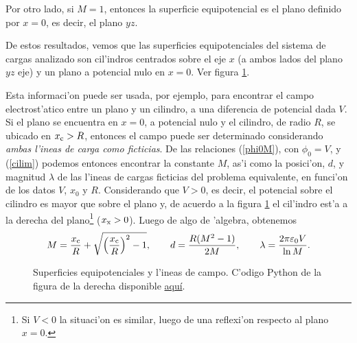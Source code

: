 Por otro lado, si $M=1$, entonces la superficie equipotencial es el plano
definido por $x=0$, es decir, el plano $yz$.

De estos resultados, vemos que las superficies equipotenciales del sistema de
cargas analizado son cil'indros centrados sobre el eje $x$ (a ambos lados del
plano $yz$ eje) y un plano a potencial nulo en $x=0$. Ver figura \ref{ci04}.
%

Esta informaci'on puede ser usada, por ejemplo, para encontrar el campo
electrost'atico entre un plano y un cilindro, a una diferencia de potencial
dada $V$. Si el plano se encuentra en $x=0$, a potencial nulo y el cilindro, de
radio $R$, se ubicado en $x_{\rm c}>R$, entonces el campo puede ser determinado
considerando \textit{ambas l'ineas de carga como ficticias}. De las relaciones
(\ref{phi0M}), con $\phi_0=V$, y (\ref{cilim}) podemos entonces encontrar la
constante $M$, as'i como la posici'on, $d$, y magnitud $\lambda$ de las l'ineas
de cargas ficticias del problema equivalente, en funci'on de los datos $V$,
$x_0$ y $R$. Considerando que $V>0$, es decir, el potencial sobre el cilindro es mayor que sobre el plano y, de acuerdo a la figura \ref{ci04} el cil'indro est'a a la derecha del plano\footnote{Si $V<0$ la situaci'on es similar, luego de una reflexi'on respecto al plano $x=0$.} ($x_{\rm x}>0$). Luego de algo de 'algebra, obtenemos
\begin{equation}
 M=\frac{x_{\rm c}}{R}+\sqrt{\left(\frac{x_{\rm c}}{R}\right)^2-1}, \qquad
d=\frac{R(M^2-1)}{2M}, \qquad \lambda=\frac{2\pi\varepsilon_0V}{\ln M}.
\end{equation}
\begin{figure}[!h]
\centerline{
\hspace{1cm}
}
\caption{Superficies equipotenciales y l'ineas de campo. C'odigo Python de la figura de la derecha disponible \href{https://github.com/gfrubi/electrodinamica/blob/master/figuras-editables/fig-metodo-imagenes-cilindros-03.py}{aqu\'i}.}
\label{ci04}
\end{figure}

